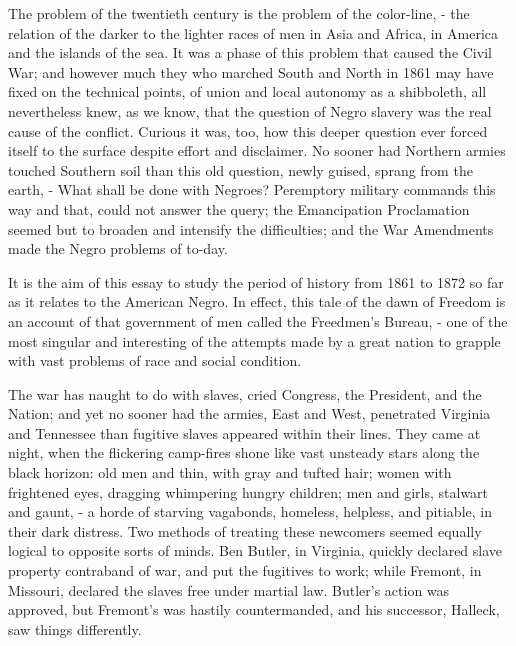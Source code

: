 The problem of the twentieth century is the problem of the color-line, - the relation of the darker to the lighter races of men in Asia and Africa, in America and the islands of the sea. It was a phase of this problem that caused the Civil War; and however much they who marched South and North in 1861 may have fixed on the technical points, of union and local autonomy as a shibboleth, all nevertheless knew, as we know, that the question of Negro slavery was the real cause of the conflict. Curious it was, too, how this deeper question ever forced itself to the surface despite effort and disclaimer. No sooner had Northern armies touched Southern soil than this old question, newly guised, sprang from the earth, - What shall be done with Negroes? Peremptory military commands this way and that, could not answer the query; the Emancipation Proclamation seemed but to broaden and intensify the difficulties; and the War Amendments made the Negro problems of to-day.\par

It is the aim of this essay to study the period of history from 1861 to 1872 so far as it relates to the American Negro. In effect, this tale of the dawn of Freedom is an account of that government of men called the Freedmen’s Bureau, - one of the most singular and interesting of the attempts made by a great nation to grapple with vast problems of race and social condition.\par

The war has naught to do with slaves, cried Congress, the President, and the Nation; and yet no sooner had the armies, East and West, penetrated Virginia and Tennessee than fugitive slaves appeared within their lines. They came at night, when the flickering camp-fires shone like vast unsteady stars along the black horizon: old men and thin, with gray and tufted hair; women with frightened eyes, dragging whimpering hungry children; men and girls, stalwart and gaunt, - a horde of starving vagabonds, homeless, helpless, and pitiable, in their dark distress. Two methods of treating these newcomers seemed equally logical to opposite sorts of minds. Ben Butler, in Virginia, quickly declared slave property contraband of war, and put the fugitives to work; while Fremont, in Missouri, declared the slaves free under martial law. Butler’s action was approved, but Fremont’s was hastily countermanded, and his successor, Halleck, saw things differently.\par

